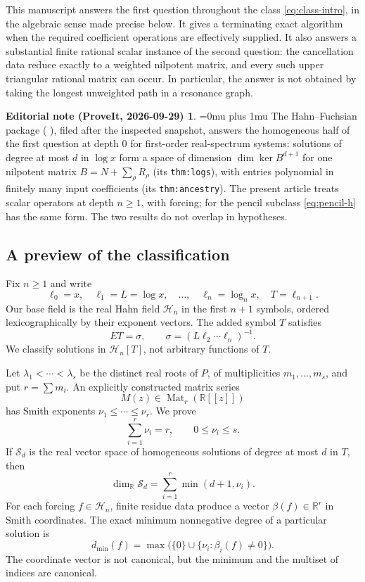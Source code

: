 \documentclass[11pt,a4paper]{article}
\numberwithin{equation}{section}
\theoremstyle{definition}
\theoremstyle{remark}
\theoremstyle{definition}
\newtheorem*{ednoteinner}{Editorial note (ProveIt, 2026-09-29)}
\newenvironment{ednote}{\begin{ednoteinner}\sloppy\Urlmuskip=0mu plus 1mu\relax}{\end{ednoteinner}}
\newcommand{\R}{\mathbb R}
\newcommand{\Hh}{\mathcal H}
\newcommand{\Mat}{\operatorname{Mat}}
\begin{document}
This manuscript answers the first question throughout the class \eqref{eq:class-intro}, in the algebraic sense made precise below. It gives a terminating exact algorithm when the required coefficient operations are effectively supplied. It also answers a substantial finite rational scalar instance of the second question: the cancellation data reduce exactly to a weighted nilpotent matrix, and every such upper triangular rational matrix can occur. In particular, the answer is not obtained by taking the longest unweighted path in a resonance graph.
\begin{ednote}
The Hahn--Fuchsian package ( \cite{ed:hfr}), filed after the inspected snapshot, answers the homogeneous half of the first question at depth $0$ for first-order real-spectrum systems: solutions of degree at most $d$ in $\log x$ form a space of dimension $\dim\ker B^{d+1}$ for one nilpotent matrix $B=N+\sum_\rho R_\rho$ (its \texttt{thm:logs}), with entries polynomial in finitely many input coefficients (its \texttt{thm:ancestry}). The present article treats scalar operators at depth $n\ge1$, with forcing; for the pencil subclass \eqref{eq:pencil-h} has the same form. The two results do not overlap in hypotheses.
\end{ednote}

\subsection{A preview of the classification}
Fix $n\ge1$ and write
\[
 \ell_0=x,\quad \ell_1=L=\log x,\quad\ldots,\quad
 \ell_n=\log_n x,\quad T=\ell_{n+1}.
\]
Our base field is the real Hahn field $\Hh_n$ in the first $n+1$ symbols, ordered lexicographically by their exponent vectors. The added symbol $T$ satisfies
\[
 ET=\sigma,\qquad \sigma=(L\ell_2\cdots\ell_n)^{-1}.
\]
We classify solutions in $\Hh_n[T]$, not arbitrary functions of $T$.

Let $\lambda_1<\cdots<\lambda_s$ be the distinct real roots of $P$, of multiplicities $m_1,\ldots,m_s$, and put $r=\sum m_i$. An explicitly constructed matrix series
\[
 M(z)\in\Mat_r(\R[[z]])
\]
has Smith exponents $\nu_1\le\cdots\le\nu_r$. We prove
\begin{equation}
 \sum_{i=1}^r\nu_i=r,\qquad 0\le\nu_i\le s.
 \label{eq:indices-preview}
\end{equation}
If $\mathscr S_d$ is the real vector space of homogeneous solutions of degree at most $d$ in $T$, then
\begin{equation}
 \dim_\R\mathscr S_d=\sum_{i=1}^r\min(d+1,\nu_i).
 \label{eq:hom-preview}
\end{equation}
For each forcing $f\in\Hh_n$, finite residue data produce a vector $\beta(f)\in\R^r$ in Smith coordinates. The exact minimum nonnegative degree of a particular solution is
\begin{equation}
 d_{\min}(f)=\max\bigl(\{0\}\cup
 \{\nu_i:\beta_i(f)\ne0\}\bigr).
 \label{eq:min-preview}
\end{equation}
The coordinate vector is not canonical, but the minimum and the multiset of indices are canonical.
\end{document}
